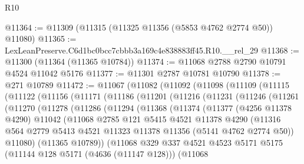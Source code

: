 \begin{lexlean}{R10}
\begin{coremodule}
@11364 := @11309 (@11315 (@11325 @11356 (@5853 @4762 @2774 @50)) @11080)
@11365 := LexLeanPreserve.C6d1bc0bcc7cbbb3a169c4e838883ff45.R10.__rel_29
@11368 := @11300 (@11364 (@11365 @10784))
@11374 := @11068 @2788 @2790 @10791 @4524 @11042 @5176
@11377 := @11301 @2787 @10781 @10790
@11378 := @271 @10789
@11472 := @11067
    (@11082
      (@11092
        (@11098
          (@11109
            (@11115
              (@11122
                (@11156
                  (@11171
                    (@11186
                      (@11201
                        (@11216
                          (@11231
                            (@11246
                              (@11261
                                (@11270
                                  (@11278
                                    (@11286
                                      (@11294
                                        (@11368
                                          (@11374
                                            (@11377
                                              (@4256 @11378 @4290)
                                              @11042
                                              (@11068
                                                @2785
                                                @121
                                                @5415
                                                @4521
                                                @11378
                                                @4290
                                                (@11316
                                                  @564
                                                  @2779
                                                  @5413
                                                  @4521
                                                  @11323
                                                  @11378
                                                  @11356
                                                  (@5141 @4762 @2774 @50))
                                                @11080)
                                              (@11365 @10789))
                                            (@11068
                                              @329
                                              @337
                                              @4521
                                              @4523
                                              @5171
                                              @5175
                                              (@11144 @128 @5171 (@4636 (@11147 @128)))
                                              (@11068

\end{coremodule}
\end{lexlean}
